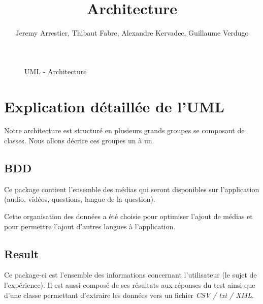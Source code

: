 \documentclass[a4paper,10pt]{report}
\title{Architecture}
\author{Jeremy Arrestier, Thibaut Fabre, Alexandre Kervadec, Guillaume Verdugo}
\begin{document}
\maketitle

  \begin{figure}[ht]
  \begin{center}
   \caption{UML - Architecture}
   \label{diaglog} 
  \end{center}
  \end{figure}
  
  \section{Explication détaillée de l'UML}
  
  Notre architecture est structuré en plusieurs grands groupes se composant de classes. Nous allons décrire ces groupes un à un.
  
  \subsection{BDD}
  
  Ce package contient l'ensemble des médias qui seront disponibles sur l'application (audio, vidéos, questions, langue de la question).
  
  Cette organisation des données a été choisie pour optimiser l'ajout de médias et pour permettre l'ajout d'autres langues à l'application.
  
  \subsection{Result}
  
  Ce package-ci est l'ensemble des informations concernant l'utilisateur (le sujet de l'expérience). Il est aussi composé de ses résultats aux réponses du test ainsi que d'une classe permettant d'extraire les données vers un fichier \textit{CSV / txt / XML}.
  
\end{document}
